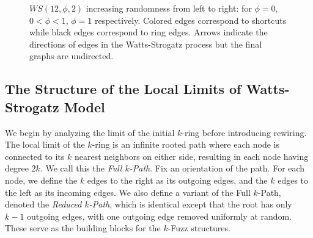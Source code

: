 \documentclass[10pt]{amsart}
\begin{document}
\begin{figure}
\begin{center}
\end{center}
\caption{$WS(12, \phi, 2)$ increasing randomness from left to right: for $\phi = 0$, $0 < \phi < 1$, $\phi = 1$ respectively. Colored edges correspond to shortcuts while black edges correspond to ring edges. Arrows indicate the directions of edges in the Watts-Strogatz process but the final graphs are undirected.}
\label{ws-model}
\end{figure}

\subsection{The Structure of the Local Limits of Watts-Strogatz Model} \label{local-limit-ws}

We begin by analyzing the limit of the initial $k$-ring before introducing rewiring. 
The local limit of the $k$-ring is an infinite rooted path where each node is connected to its $k$ nearest neighbors on either side, resulting in each node having degree $2k$.
We call this the \emph{Full $k$-Path}. 
Fix an orientation of the path. For each node, we define the $k$ edges to the right as its outgoing edges, and the $k$ edges to the left as its incoming edges.
We also define a variant of the Full $k$-Path, denoted the \emph{Reduced $k$-Path}, which is identical except that the root has only $k-1$ outgoing edges, with one outgoing edge removed uniformly at random.
These serve as the building blocks for the $k$-Fuzz structures.
\end{document}
